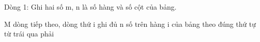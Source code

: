 Dòng 1: Ghi hai số m, n là số hàng và số cột của bảng.  

   M dòng tiếp theo, dòng thứ i ghi đủ n số trên hàng i của bảng theo đúng thứ tự từ trái qua phải
